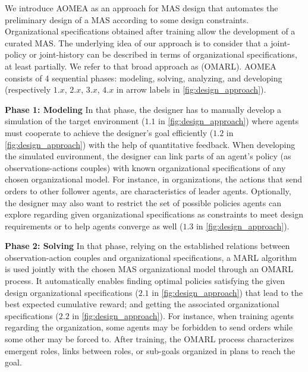 \documentclass[runningheads]{llncs}
\newcounter{relation}
\begin{document}
We introduce AOMEA as an approach for MAS design that automates the preliminary design of a MAS according to some design constraints. Organizational specifications obtained after training allow the development of a curated MAS.
The underlying idea of our approach is to consider that a joint-policy or joint-history can be described in terms of organizational specifications, at least partially.
We refer to that broad approach as  (OMARL).
%
%
AOMEA consists of 4 sequential phases: modeling, solving, analyzing, and developing (respectively $1.x$, $2.x$, $3.x$, $4.x$ in arrow labels in \autoref{fig:design_approach}).

\textbf{Phase 1: Modeling} \quad In that phase, the designer has to manually develop a simulation of the target environment ($1.1$ in \autoref{fig:design_approach}) where agents must cooperate to achieve the designer's goal efficiently ($1.2$ in \autoref{fig:design_approach}) with the help of quantitative feedback. When developing the simulated environment, the designer can link parts of an agent's policy (as observations-actions couples) with known organizational specifications of any chosen organizational model.
For instance, in  organizations, the actions that send orders to other follower agents, are characteristics of leader agents.
Optionally, the designer may also want to restrict the set of possible policies agents can explore regarding given organizational specifications as constraints to meet design requirements or to help agents converge as well ($1.3$ in \autoref{fig:design_approach}).

\textbf{Phase 2: Solving} \quad In that phase, relying on the established relations between observation-action couples and organizational specifications, a MARL algorithm is used jointly with the chosen MAS organizational model through an OMARL process. It automatically enables finding optimal policies satisfying the given design organizational specifications ($2.1$ in \autoref{fig:design_approach}) that lead to the best expected cumulative reward; and getting the associated organizational specifications ($2.2$ in \autoref{fig:design_approach}). For instance, when training agents regarding the  organization, some agents may be forbidden to send orders while some other may be forced to. After training, the OMARL process characterizes emergent roles, links between roles, or sub-goals organized in plans to reach the goal.
\end{document}
